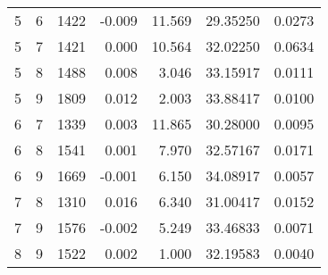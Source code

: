 \begin{longtable}{rrrrrrr}
5 & 6 & 1422 & -0.009 & 11.569 & 29.35250 & 0.0273 \\ 
5 & 7 & 1421 & 0.000 & 10.564 & 32.02250 & 0.0634 \\ 
5 & 8 & 1488 & 0.008 & 3.046 & 33.15917 & 0.0111 \\ 
5 & 9 & 1809 & 0.012 & 2.003 & 33.88417 & 0.0100 \\ 
6 & 7 & 1339 & 0.003 & 11.865 & 30.28000 & 0.0095 \\ 
6 & 8 & 1541 & 0.001 & 7.970 & 32.57167 & 0.0171 \\ 
6 & 9 & 1669 & -0.001 & 6.150 & 34.08917 & 0.0057 \\ 
7 & 8 & 1310 & 0.016 & 6.340 & 31.00417 & 0.0152 \\ 
7 & 9 & 1576 & -0.002 & 5.249 & 33.46833 & 0.0071 \\ 
8 & 9 & 1522 & 0.002 & 1.000 & 32.19583 & 0.0040 \\ 
\bottomrule
\end{longtable}


